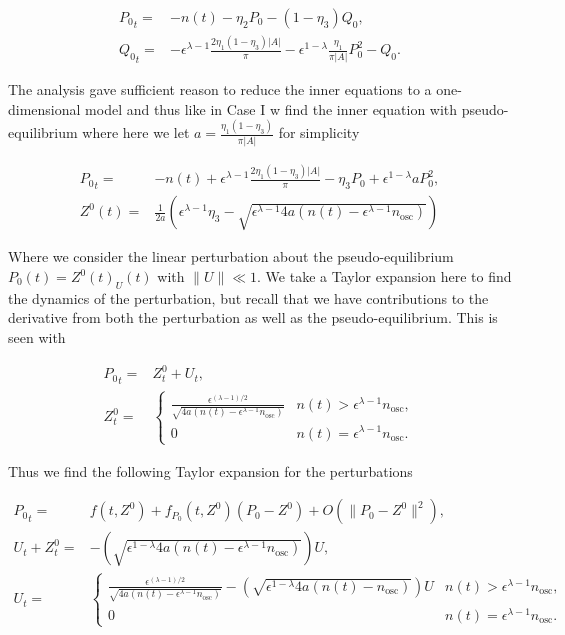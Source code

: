 \begin{equation*}
\begin{aligned}
{P_0}_t =& - n(t)-\eta_2 P_0 -(1-\eta_3)Q_0,\\
{Q_0}_t =& -\epsilon^{\lambda-1}\frac{2\eta_1(1-\eta_3)|A|}{\pi}-\epsilon^{1-\lambda}\frac{\eta_1}{\pi|A|}P_0^2- Q_0.
\end{aligned}
\end{equation*}

The analysis gave sufficient reason to reduce the inner equations to a one-dimensional model and thus like in Case I w find the inner equation with pseudo-equilibrium where here we let $a=\frac{\eta_1(1-\eta_3)}{\pi|A|}$ for simplicity

\begin{equation*}
\begin{aligned}
{P_0}_t =& -n(t)+\epsilon^{\lambda-1}\frac{2\eta_1(1-\eta_3)|A|}{\pi}-\eta_3 P_0+\epsilon^{1-\lambda}aP_0^2,\\
Z^0(t) =& \frac{1}{2a}\left(\epsilon^{\lambda-1}\eta_3-\sqrt{\epsilon^{\lambda-1}4a(n(t)-\epsilon^{\lambda-1}n_{\text{osc}})}\right)
\end{aligned}
\end{equation*}

Where we consider the linear perturbation about the pseudo-equilibrium $P_0(t)= Z^0(t)_U(t)$ with $\lVert U\rVert \ll 1$. We take a Taylor expansion here to find the dynamics of the perturbation, but recall that we have contributions to the derivative from both the perturbation as well as the pseudo-equilibrium. This is seen with

\begin{equation}
\begin{aligned}
{P_0}_t =& Z^0_t+U_t,\\
Z^0_t=&\begin{cases}
\frac{\epsilon^{(\lambda-1)/2}}{\sqrt{4a(n(t)-\epsilon^{\lambda-1}n_{\text{osc}})}} & n(t)>\epsilon^{\lambda-1}n_{\text{osc}},\\
0 & n(t)=\epsilon^{\lambda-1}n_{\text{osc}}.
\end{cases}
\end{aligned}
\end{equation}

Thus we find the following Taylor expansion for the perturbations

\begin{equation}\label{eq:twoD_slowosc_stability_caseII_perturb}
\begin{aligned}
{P_0}_t =& f(t,Z^0)+f_{P_0}(t,Z^0)(P_0-Z^0)+O(\lVert P_0-Z^0 \rVert^2),\\
U_t+Z^0_t=& -\left(\sqrt{\epsilon^{1-\lambda}4a(n(t)-\epsilon^{\lambda-1}n_{\text{osc}})}\right) U,\\
U_t = & \begin{cases}
\frac{\epsilon^{(\lambda-1)/2}}{\sqrt{4a(n(t)-\epsilon^{\lambda-1}n_{\text{osc}})}}-\left(\sqrt{\epsilon^{1-\lambda}4a(n(t)-n_{\text{osc}})}\right) U & n(t)>\epsilon^{\lambda-1}n_{\text{osc}},\\
0 & n(t)=\epsilon^{\lambda-1}n_{\text{osc}}.
\end{cases}
\end{aligned}
\end{equation}


